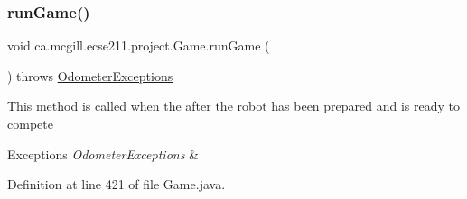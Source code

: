 \subsubsection{\texorpdfstring{run\+Game()}{runGame()}}
{\footnotesize\ttfamily void ca.\+mcgill.\+ecse211.\+project.\+Game.\+run\+Game (\begin{DoxyParamCaption}{ }\end{DoxyParamCaption}) throws \hyperlink{classca_1_1mcgill_1_1ecse211_1_1odometer_1_1_odometer_exceptions}{Odometer\+Exceptions}}

This method is called when the after the robot has been prepared and is ready to compete


\begin{DoxyExceptions}{Exceptions}
{\em Odometer\+Exceptions} & \\
\hline
\end{DoxyExceptions}


Definition at line 421 of file Game.\+java.



